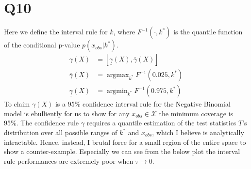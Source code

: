 \documentclass[11pt, letterpaper]{article}
\begin{document}
\section{Q10}
Here we define the interval rule for $k$, where $F^{-1}(\cdot, k^*)$ is the quantile function of the conditional p-value $p(x_{obs}|k^*)$.
\begin{align*}
    \gamma(X) &= [\underline{\gamma}(X), \overline{\gamma}(X)] \\
    \overline{\gamma}(X) &= \mathop{\arg\max}_{k^*} F^{-1}(0.025, k^*) \\
    \underline{\gamma}(X) &= \mathop{\arg\min}_{k^*} F^{-1}(0.975, k^*)
\end{align*}
To claim $\gamma(X)$ is a 95\% confidence interval rule for the Negative Binomial model is ebulliently for us to show for any $x_{obs} \in \mathscr{X}$ the minimum coverage is 95\%. The confidence rule $\gamma$ requires a quantile estimation of the test statistics $T$'s distribution over all possible ranges of $k^*$ and $x_{obs}$, which I believe is analytically intractable. Hence, instead, I brutal force for a small region of the entire space to show a counter-example. Especially we can see from the below plot the interval rule performances are extremely poor when $\tau \rightarrow 0$.
\end{document}
